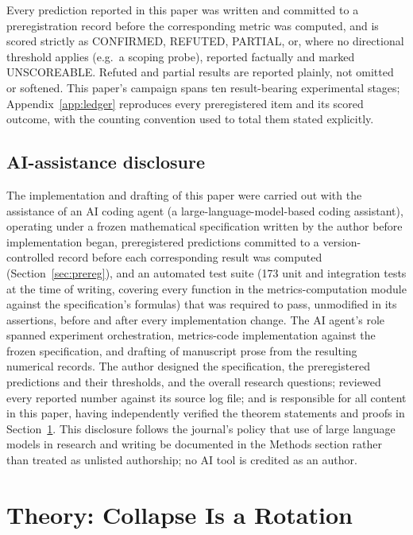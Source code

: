\documentclass[pdflatex,sn-mathphys-ay]{sn-jnl}
\theoremstyle{thmstyleone}
\theoremstyle{thmstyletwo}
\begin{document}
Every prediction reported in this paper was written and committed to a preregistration record before the corresponding metric was computed, and is scored strictly as CONFIRMED, REFUTED, PARTIAL, or, where no directional threshold applies (e.g.\ a scoping probe), reported factually and marked UNSCOREABLE. Refuted and partial results are reported plainly, not omitted or softened. This paper's campaign spans ten result-bearing experimental stages; Appendix~\ref{app:ledger} reproduces every preregistered item and its scored outcome, with the counting convention used to total them stated explicitly.

\subsection{AI-assistance disclosure}
\label{sec:ai-disclosure}

The implementation and drafting of this paper were carried out with the assistance of an AI coding agent (a large-language-model-based coding assistant), operating under a frozen mathematical specification written by the author before implementation began, preregistered predictions committed to a version-controlled record before each corresponding result was computed (Section~\ref{sec:prereg}), and an automated test suite (173 unit and integration tests at the time of writing, covering every function in the metrics-computation module against the specification's formulas) that was required to pass, unmodified in its assertions, before and after every implementation change. The AI agent's role spanned experiment orchestration, metrics-code implementation against the frozen specification, and drafting of manuscript prose from the resulting numerical records. The author designed the specification, the preregistered predictions and their thresholds, and the overall research questions; reviewed every reported number against its source log file; and is responsible for all content in this paper, having independently verified the theorem statements and proofs in Section~\ref{sec:theory}. This disclosure follows the journal's policy that use of large language models in research and writing be documented in the Methods section rather than treated as unlisted authorship; no AI tool is credited as an author.

\section{Theory: Collapse Is a Rotation}
\label{sec:theory}
\end{document}

